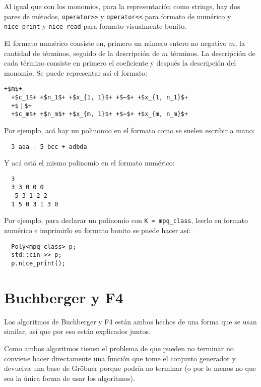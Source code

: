 \documentclass[12pt]{report}
\theoremstyle{customstyle}
\theoremstyle{factstyle}
\begin{document}
Al igual que con los monomios, para la representación como strings, hay dos pares de métodos, \texttt{operator>>} y \texttt{operator<<} para formato de numérico y \texttt{nice\_print} y \texttt{nice\_read} para formato visualmente bonito.

El formato numérico consiste en, primero un número entero no negativo $m$, la cantidad de términos, seguido de la descripción de $m$ términos. La descripción de cada término consiste en primero el coeficiente y después la descripción del monomio. Se puede representar así el formato:

\begin{lstlisting}[escapechar=+]
  +$m$+
  +$c_1$+ +$n_1$+ +$x_{1, 1}$+ +$⋯$+ +$x_{1, n_1}$+
  +$⋮$+
  +$c_m$+ +$n_m$+ +$x_{m, 1}$+ +$⋯$+ +$x_{m, n_m}$+
\end{lstlisting}

Por ejemplo, acá hay un polinomio en el formato como se suelen escribir a mano:

\begin{lstlisting}
  3 aaa - 5 bcc + adbda
\end{lstlisting}

\noindent Y acá está el mismo polinomio en el formato numérico:

\begin{lstlisting}
  3
  3 3 0 0 0
  -5 3 1 2 2
  1 5 0 3 1 3 0
\end{lstlisting}

Por ejemplo, para declarar un polinomio con \texttt{K = mpq\_class}, leerlo en formato numérico e imprimirlo en formato bonito se puede hacer así:

\begin{verbatim}
  Poly<mpq_class> p;
  std::cin >> p;
  p.nice_print();
\end{verbatim}

\section{Buchberger y F4}

Los algoritmos de Buchberger y F4 están ambos hechos de una forma que se usan similar, así que por eso están explicados juntos.

Como ambos algoritmos tienen el problema de que pueden no terminar no conviene hacer directamente una función que tome el conjunto generador y devuelva una base de Gröbner porque podría no terminar (o por lo menos no que sea la única forma de usar los algoritmos).
\end{document}
